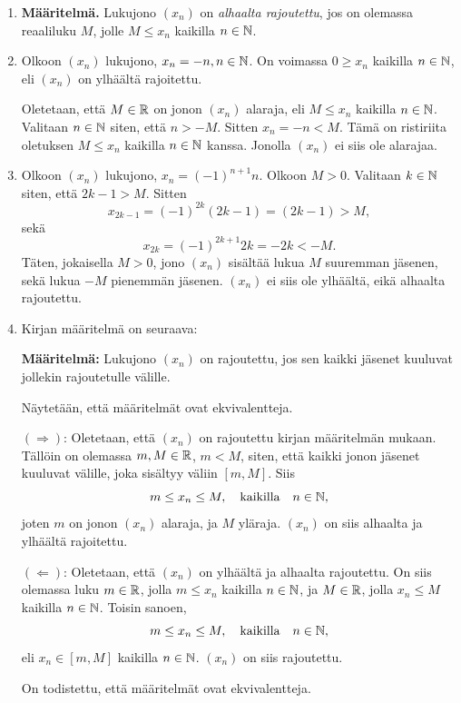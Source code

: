 \documentclass[11pt,a4paper]{amsart}
\begin{document}
\begin{solution}
\leavevmode\par
\begin{enumerate}[label=\alph*), nosep]
\item \textbf{Määritelmä.} Lukujono \((x_n)\) on \emph{alhaalta rajoutettu},
  jos on olemassa reaaliluku \(M\), jolle \(M \leq x_n\) kaikilla \(n \in \mathbb{N}\).
\item Olkoon \((x_n)\) lukujono, \(x_n = -n, n \in \mathbb{N}\). On voimassa
  \(0 \geq x_n\) kaikilla \(n \in \mathbb{N}\), eli \((x_n)\) on ylhäältä
  rajoitettu.

  Oletetaan, että \(M \in \mathbb{R}\) on jonon \((x_n)\) alaraja, eli
  \(M \leq x_n\) kaikilla \(n \in \mathbb{N}\).
  Valitaan \(n \in \mathbb{N}\) siten, että \(n > -M\). Sitten
  \(x_n = -n < M\). Tämä on ristiriita oletuksen
  \(M \leq x_n\) kaikilla \(n \in \mathbb{N}\) kanssa. Jonolla \((x_n)\) ei
  siis ole alarajaa.
\item Olkoon \((x_n)\) lukujono, \(x_n = (-1)^{n + 1}n\). Olkoon \(M > 0\).
  Valitaan \(k \in \mathbb{N}\) siten, että \(2k - 1 > M\). Sitten
  \[
    x_{2k - 1} = (-1)^{2k} (2k - 1) = (2k - 1) > M,
  \]
  sekä
  \[
    x_{2k} = (-1)^{2k + 1} 2k = -2k < -M.
  \]
  Täten, jokaisella \(M > 0\), jono \((x_n)\) sisältää lukua \(M\) suuremman
  jäsenen, sekä lukua \(-M\) pienemmän jäsenen. \((x_n)\) ei siis ole
  ylhäältä, eikä alhaalta rajoutettu.
\item Kirjan määritelmä on seuraava:

  \textbf{Määritelmä:} Lukujono \((x_n)\) on rajoutettu, jos sen kaikki jäsenet
  kuuluvat jollekin rajoutetulle välille.

  Näytetään, että määritelmät ovat ekvivalentteja.

  \((\Rightarrow)\): Oletetaan, että \((x_n)\) on rajoutettu kirjan määritelmän
  mukaan. Tällöin on olemassa \(m, M \in \mathbb{R}\), \(m < M\), siten, että
  kaikki jonon jäsenet kuuluvat välille, joka sisältyy väliin \([m, M]\).
  Siis
  \[
    m \leq x_n \leq M, \quad \text{kaikilla} \quad n \in \mathbb{N},
  \]
  joten \(m\) on jonon \((x_n)\) alaraja, ja \(M\) yläraja. \((x_n)\) on siis
  alhaalta ja ylhäältä rajoitettu.

  \((\Leftarrow)\): Oletetaan, että \((x_n)\) on ylhäältä ja alhaalta
  rajoutettu. On siis olemassa luku \(m \in \mathbb{R}\), jolla \(m \leq x_n\) kaikilla
  \(n \in \mathbb{N}\), ja \(M \in \mathbb{R}\), jolla \(x_n \leq M\) kaikilla \(n \in \mathbb{N}\).
  Toisin sanoen,
  \[
    m \leq x_n \leq M, \quad \text{kaikilla} \quad n \in \mathbb{N},
  \]
  eli \(x_n \in [m, M]\) kaikilla \(n \in \mathbb{N}\). \((x_n)\) on siis rajoutettu.

  On todistettu, että määritelmät ovat ekvivalentteja.
\end{enumerate}
\end{solution}
\end{document}
